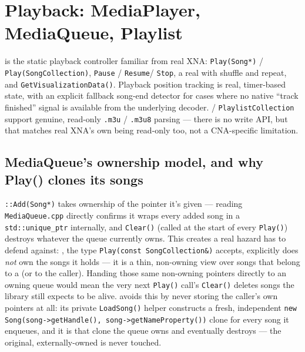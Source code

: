 \section{Playback: MediaPlayer, MediaQueue, Playlist}

 is the static playback controller familiar from real XNA:
\texttt{Play(Song*)} / \texttt{Play(SongCollection)}, \texttt{Pause} / \texttt{Resume}/%
\texttt{Stop}, a real  with shuffle and repeat, and
\texttt{GetVisualizationData()}. Playback position tracking is real, timer-based state, with
an explicit fallback song-end detector for cases where no native ``track finished'' signal is
available from the underlying decoder.  / \texttt{PlaylistCollection}
support genuine, read-only \texttt{.m3u} / \texttt{.m3u8} parsing --- there is no write API, but
that matches real XNA's own  being read-only too, not a CNA-specific
limitation.

\subsection{MediaQueue's ownership model, and why Play() clones its songs}

\texttt{::Add(Song*)} takes ownership of the pointer it's given --- reading
\texttt{MediaQueue.cpp} directly confirms it wraps every added song in a
\texttt{std::unique\_ptr} internally, and \texttt{Clear()} (called at the start of every
\texttt{Play()}) destroys whatever the queue currently owns. This creates a real hazard
 has to defend against: , the type
\texttt{Play(const SongCollection\&)} accepts, explicitly does \emph{not} own the songs it
holds --- it is a thin, non-owning view over songs that belong to a  (or
to the caller). Handing those same non-owning pointers directly to an owning queue would mean
the very next \texttt{Play()} call's \texttt{Clear()} deletes songs the library still expects
to be alive.  avoids this by never storing the caller's own
 pointers at all: its private \texttt{LoadSong()} helper constructs a fresh,
independent \texttt{new Song(song->getHandle(), song->getNameProperty())} clone for every song
it enqueues, and it is that clone the queue owns and eventually destroys --- the original,
externally-owned  is never touched.

